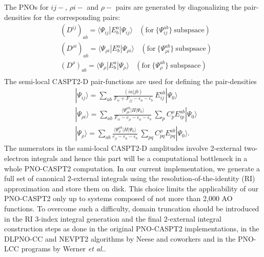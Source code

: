 \documentclass[aip,jcp,amsmath]{revtex4-1}
\begin{document}
%
The PNOs for $ij-$, $\rho i-$ and $\rho-$ pairs are generated by diagonalizing the pair-densities for the corresponding pairs:
%
\begin{align}
  &(D^{ij})_{ab}    =\langle\Psi_{ij}    |E^a_b|\Psi_{ij}    \rangle \ \ \ \ (\text{for}\ \{\Psi_{ij}^{ab}\}\ \text{subspsace})\\
  &(D^{\rho i})_{ab}=\langle\Psi_{\rho i}|E^a_b|\Psi_{\rho i}\rangle \ \ \ \ (\text{for}\ \{\Psi_{\rho i}^{ab}\}\ \text{subspsace})\\
  &(D^{\rho})_{ab}  =\langle\Psi_{\rho}  |E^a_b|\Psi_{\rho}  \rangle \ \ \ \ (\text{for}\ \{\Psi_{\rho}^{ab}\}\ \text{subspsace})\\  
\end{align}
%
The semi-local CASPT2-D pair-functions are used for defining the pair-densities
%
\begin{align}
  &|\Psi_{ij}\rangle=\sum_{ab}\frac{(ia|jb)}{F_{ii}+F_{jj}-\epsilon_a-\epsilon_b}\ E_{ij}^{ab}|\Psi_0\rangle \\
  &|\Psi_{\rho i}\rangle=\sum_{ab}\frac{\langle\Psi_{\rho i}^{ab}|H|\Psi_0\rangle}{F_{ii}-e_\rho-\epsilon_a-\epsilon_b}\ \sum_{p} C_p^\rho E_{ip}^{ab}|\Psi_0\rangle \\
  &|\Psi_{\rho}\rangle=\sum_{ab}\frac{\langle\Psi_{\rho}^{ab}|H|\Psi_0\rangle}{e_\rho-\epsilon_a-\epsilon_b}\ \sum_{pq} C_{pq}^\rho E_{pq}^{ab}|\Psi_0\rangle.
\end{align}
%
The numerators in the sami-local CASPT2-D amplitudes involve 2-external two-electron integrals and hence this part will be a computational bottleneck in a whole PNO-CASPT2 computation.
%
In our current implementation, we generate a full set of canonical 2-external integrals using the resolution-of-the-identity (RI) approximation and store them on disk.
%
This choice limits the applicability of our PNO-CASPT2 only up to systems composed of not more than 2,000 AO functions.
%
To overcome such a difficulty, domain truncation should be introduced in the RI 3-index integral generation and the final 2-external integral construction steps as done in the original PNO-CASPT2 implementations,\cite{:/content/aip/journal/jcp/145/12/10.1063/1.4963019,doi:10.1063/1.5097644} in the DLPNO-CC and NEVPT2 algorithms by Neese and coworkers\cite{riplingeran2013,riplingernatural2013,pinskisparse2015,riplingersparse2016,doi:10.1063/1.4981521,:/content/aip/journal/jcp/144/9/10.1063/1.4942769,dipayan2016,doi:10.1063/1.5027114} and in the PNO-LCC programs by Werner {\it et al.}.\cite{doi:10.1021/ct500725e,doi:10.1021/acs.jctc.5b00843,wernersdecay,doi:10.1021/acs.jctc.7b00554}
\end{document}
